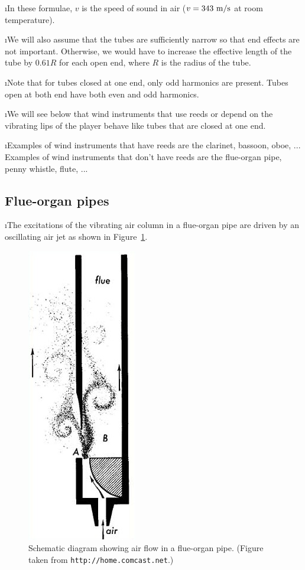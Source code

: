 \i In these formulae, $v$ is the speed of sound in air 
($v=343~{\rm m/s}$ at room temperature).

\i We will also assume that the tubes are sufficiently
narrow so that end effects are not important.
Otherwise, we would have to increase the effective 
length of the tube by $0.61 R$ for each open end,
where $R$ is the radius of the tube.

\i Note that for tubes closed at one end,
only odd harmonics are present.
Tubes open at both end have both even and odd 
harmonics.

\i We will see below that wind instruments that
use reeds or depend on the vibrating lips of the 
player behave like tubes that are closed at one end.

\i Examples of wind instruments that have reeds 
are the clarinet, bassoon, oboe, ...\\
Examples of wind instruments that don't have reeds
are the flue-organ pipe, penny whistle, flute, ...

\ei
\subsection{Flue-organ pipes}
\bi

\i The excitations of the vibrating air 
column in a flue-organ pipe are driven by an
oscillating air jet as shown in 
Figure~\ref{f:fluepipe}.
%
\begin{figure}[htbp]
\begin{center}
\includegraphics[width=.3\textwidth]{fluepipe.jpg}
\caption{Schematic diagram showing air flow
in a flue-organ pipe.
(Figure taken from {\tt http://home.comcast.net}.)}
\label{f:fluepipe}
\end{center}
\end{figure}

